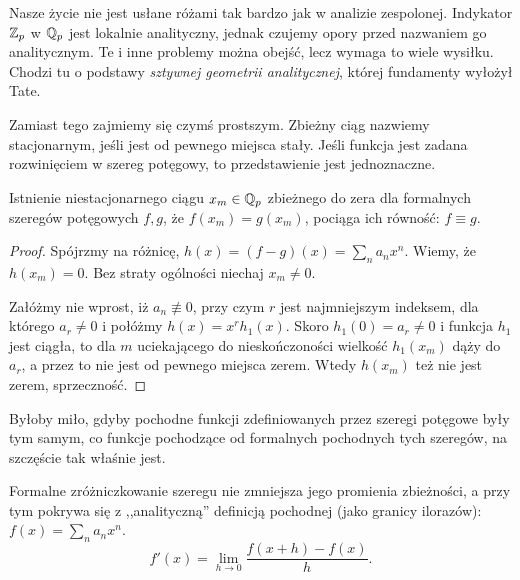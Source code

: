 Nasze życie nie jest usłane różami tak bardzo jak w analizie zespolonej.
Indykator $\mathbb Z_p$ w $\mathbb Q_p$ jest lokalnie analityczny, jednak czujemy opory przed nazwaniem go analitycznym.
Te i inne problemy można obejść, lecz wymaga to wiele wysiłku.
Chodzi tu o podstawy \emph{sztywnej geometrii analitycznej}, której fundamenty wyłożył Tate.

Zamiast tego zajmiemy się czymś prostszym.
Zbieżny ciąg nazwiemy {stacjonarnym}, jeśli jest od pewnego miejsca stały.
Jeśli funkcja jest zadana rozwinięciem w szereg potęgowy, to przedstawienie jest jednoznaczne.

\begin{fakt} \label{fratris}
	Istnienie niestacjonarnego ciągu $x_m \in \mathbb Q_p$ zbieżnego do zera dla formalnych szeregów potęgowych $f, g$, że $f(x_m) = g(x_m)$, pociąga ich równość: $f \equiv g$.
\end{fakt}

\begin{proof}
	Spójrzmy na różnicę, $h(x) = (f - g)(x) = \sum_n a_nx^n$.
	Wiemy, że $h(x_m) = 0$.
	Bez straty ogólności niechaj $x_m \neq 0$.

	Załóżmy nie wprost, iż $a_n \not\equiv 0$, przy czym $r$ jest najmniejszym indeksem, dla którego $a_r \neq 0$ i połóżmy $h(x) = x^r h_1(x)$.
	Skoro $h_1(0) = a_r \neq 0$ i funkcja $h_1$ jest ciągła, to dla $m$ uciekającego do nieskończoności wielkość $h_1(x_m)$ dąży do $a_r$, a przez to nie jest od pewnego miejsca zerem.
	Wtedy $h(x_m)$ też nie jest zerem, sprzeczność.
\end{proof}

Byłoby miło, gdyby pochodne funkcji zdefiniowanych przez szeregi potęgowe były tym samym, co funkcje pochodzące od formalnych pochodnych tych szeregów, na szczęście tak właśnie jest.

\begin{fakt} \label{maris}
	Formalne zróżniczkowanie szeregu nie zmniejsza jego promienia zbieżności, a przy tym pokrywa się z ,,analityczną'' definicją pochodnej (jako granicy ilorazów): $f(x) = \sum_n a_nx^n$.
	\[
		f'(x) = \lim_{h \to 0} \frac {f(x+h)-f(x)}h.
	\]
\end{fakt}

